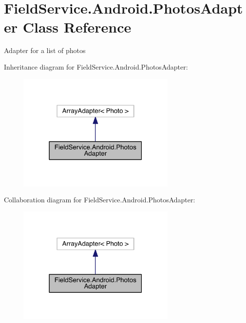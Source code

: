 \hypertarget{class_field_service_1_1_android_1_1_photos_adapter}{\section{Field\+Service.\+Android.\+Photos\+Adapter Class Reference}
\label{class_field_service_1_1_android_1_1_photos_adapter}
}


Adapter for a list of photos  




Inheritance diagram for Field\+Service.\+Android.\+Photos\+Adapter\+:
\nopagebreak
\begin{figure}[H]
\begin{center}
\leavevmode
\includegraphics[width=222pt]{class_field_service_1_1_android_1_1_photos_adapter__inherit__graph}
\end{center}
\end{figure}


Collaboration diagram for Field\+Service.\+Android.\+Photos\+Adapter\+:
\nopagebreak
\begin{figure}[H]
\begin{center}
\leavevmode
\includegraphics[width=222pt]{class_field_service_1_1_android_1_1_photos_adapter__coll__graph}
\end{center}
\end{figure}

